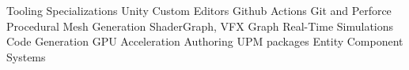 

\begin{center}
\begin{skills}
                       {Tooling}                           {Specializations}
             {Unity Custom Editors}              {Github Actions}
          {Git and Perforce}                  {Procedural Mesh Generation}
              {ShaderGraph, VFX Graph}            {Real-Time Simulations}
      {Code Generation}                   {GPU Acceleration}
            {Authoring UPM packages}            {Entity Component Systems}
\end{skills}
\end{center}